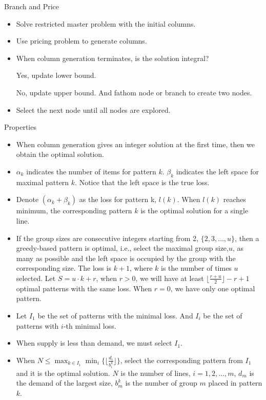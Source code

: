     \begin{frame}{Branch and Price}
        \begin{itemize}
          \item Solve restricted master problem with the initial columns.
          \item Use pricing problem to generate columns.
          \item When column generation terminates, is the solution integral?

          Yes, update lower bound.

          No, update upper bound. And fathom node or branch to create two nodes.
          \item Select the next node until all nodes are explored.
        \end{itemize}
    \end{frame}

    \begin{frame}{Properties}
      \begin{itemize}
        \item When column generation gives an integer solution at the first time, then we obtain the optimal solution.
        \item $\alpha_k$ indicates the number of items for pattern $k$. $\beta_k$ indicates the left space for maximal pattern $k$. Notice that the left space is the true loss.
        \item Denote $(\alpha_k + \beta_k)$ as the loss for pattern k, $l(k)$. When $l(k)$ reaches minimum, the corresponding pattern $k$ is the optimal solution for a single line.
        \item If the group sizes are consecutive integers starting from 2, $\{2,3,\ldots,u\}$, then a greedy-based pattern is optimal, i.e., select the maximal group size,$u$, as many as possible and the left space is occupied by the group with the corresponding size. The loss is $k+1$, where $k$ is the number of times $u$ selected. Let $S = u\cdot k + r$, when $r>0$, we will have at least $\lfloor \frac{r+u}{2} \rfloor -r +1$ optimal patterns with the same loss. When $r =0$, we have only one optimal pattern.
      \end{itemize}
    \end{frame}

    \begin{frame}
      \begin{itemize}
        \item Let $I_1$ be the set of patterns with the minimal loss. And $I_i$ be the set of patterns with $i$-th minimal loss.
        \item When supply is less than demand, we must select $I_1$.
        \item When $N \leq \max_{k\in I_1} \min_{i} \{\lfloor \frac{d_i}{b_i^k}\rfloor\}$, select the corresponding pattern from $I_1$ and it is the optimal solution.
        $N$ is the number of lines, $i = 1,2,\ldots, m$, $d_m$ is the demand of the largest size, $b_m^k$ is the number of group $m$ placed in pattern $k$.

      \end{itemize}
    \end{frame}

